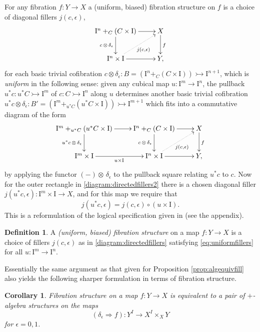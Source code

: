 \documentclass[11pt]{article}
\newcommand{\mono}{\ensuremath{\rightarrowtail}}
\newcommand{\I}{\ensuremath{\mathrm{I}}}
\newtheorem{corollary}[theorem]{Corollary}
\theoremstyle{remark}
\theoremstyle{definition}
\newtheorem{definition}[theorem]{Definition}
\begin{document}
For any fibration $f:Y\to X$  a (uniform, biased) fibration structure on $f$ is a choice of diagonal fillers $j(c,\epsilon)$,
\begin{equation}\label{diagram:directedfillers}
\xymatrix{
\I^n +_C (C\times\I) \ar[d]_{c\,\otimes\,\delta_\epsilon} \ar[r] & X \ar[d]^f \\
\I^{n}\times \I \ar@{.>}[ru]_{j(c,\epsilon)} \ar[r] & Y,
}
\end{equation}
for each basic trivial cofibration $c \otimes \delta_\epsilon : B = (\I^n +_C (C\times\I)) \mono \I^{n+1}$, which is \emph{uniform} in the following sense: given any cubical map $u : \I^m \to \I^n$, the pullback $u^*c : u^*C\mono \I^m$ of $c : C\mono \I^n$ along $u$ determines another basic trivial cofibration $u^*c \otimes \delta_\epsilon : B' = (\I^m +_{u^*C} (u^*C\times\I)) \mono \I^{m+1}$ which fits into a commutative diagram of the form
\begin{equation}\label{diagram:directedfillers2}
\xymatrix{
\I^m +_{u^*C} (u^*C\times\I) \ar[d]_{u^*c\,\otimes\,\delta_\epsilon} \ar[r] & \I^n +_C (C\times\I) \ar[d]_{c\,\otimes\,\delta_\epsilon} \ar[r] & X \ar[d]^f \\
\I^{m}\times \I  \ar[r]_{u\times \I} & \I^{n}\times \I \ar@{.>}[ru]_{j(c,\epsilon)} \ar[r] & Y,
}
\end{equation}
by applying the functor $(-)\otimes\,\delta_\epsilon$ to the pullback square relating $u^*c$ to $c$.  Now for the outer rectangle in \eqref{diagram:directedfillers2} there is a chosen diagonal filler $j(u^*c,\epsilon): \I^m\times\I\to X$, and for this map we require that
\begin{equation}\label{eq:uniformfillers}
j(u^*c,\epsilon) = j(c,\epsilon)\circ (u\times \I).
\end{equation}
This is a reformulation of the logical specification given in \cite{CCHM} (see the appendix).

\begin{definition}\label{def:uniform} A \emph{(uniform, biased) fibration structure} on a map $f: Y\to X$ is a choice of fillers $j(c,\epsilon)$ as in \eqref{diagram:directedfillers} satisfying \eqref{eq:uniformfillers} for all $u : \I^m\to\I^n$.
\end{definition}

Essentially the same argument as that given for Proposition \ref{prop:algequivfill} also yields the following sharper formulation in terms of fibration structure.
\begin{corollary}\label{cor:fibstrequivplustr}
Fibration structure on a map $f : Y\to X$ is equivalent to a pair of $+$-algebra structures on the maps $$(\delta_\epsilon\Rightarrow{f}) : Y^I \to X^I\times_X Y$$ for $\epsilon = 0,1$.
\end{corollary}
\end{document}
